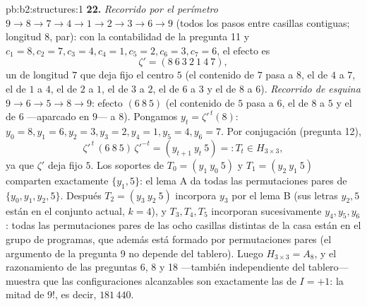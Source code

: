 \begin{solution}{pb:b2:structures:1}
\textbf{22.} \emph{Recorrido por el perímetro} $9 \to 8 \to 7 \to 4
\to 1 \to 2 \to 3 \to 6 \to 9$ (todos los pasos entre casillas
contiguas; longitud $8$, par): con la contabilidad de la pregunta
11 y $c_1 = 8, c_2 = 7, c_3 = 4, c_4 = 1, c_5 = 2, c_6 = 3, c_7 =
6$, el efecto es
\[
\zeta' = (8\ 6\ 3\ 2\ 1\ 4\ 7),
\]
un  de longitud $7$ que deja fijo el centro $5$ (el contenido
de $7$ pasa a $8$, el de $4$ a $7$, el de $1$ a $4$, el de $2$ a
$1$, el de $3$ a $2$, el de $6$ a $3$ y el de $8$ a $6$).
\emph{Recorrido de esquina} $9 \to 6 \to 5 \to 8 \to 9$: efecto
$(6\ 8\ 5)$ (el contenido de $5$ pasa a $6$, el de $8$ a $5$ y el
de $6$ ---aparcado en $9$--- a $8$). Pongamos $y_t =
\zeta'^{\,t}(8)$: $y_0 = 8, y_1 = 6, y_2 = 3, y_3 = 2, y_4 = 1, y_5
= 4, y_6 = 7$. Por conjugación (pregunta 12),
\[
\zeta'^{\,t}\,(6\ 8\ 5)\,\zeta'^{-t}
= (y_{t+1}\ y_t\ 5) =: T_t \in H_{3\times3},
\]
ya que $\zeta'$ deja fijo $5$. Los soportes de $T_0 = (y_1\ y_0\
5)$ y $T_1 = (y_2\ y_1\ 5)$ comparten exactamente $\{y_1, 5\}$: el
lema A da todas las permutaciones pares de $\{y_0, y_1, y_2, 5\}$.
Después $T_2 = (y_3\ y_2\ 5)$ incorpora $y_3$ por el lema B (sus
letras $y_2, 5$ están en el conjunto actual, $k = 4$), y $T_3, T_4,
T_5$ incorporan sucesivamente $y_4, y_5, y_6$: todas las
permutaciones pares de las ocho casillas distintas de la casa están
en el grupo de programas, que además está formado por permutaciones
pares (el argumento de la pregunta 9 no depende del tablero). Luego
$H_{3\times3} = A_8$, y el razonamiento de las preguntas 6, 8 y 18
---también independiente del tablero--- muestra que las
configuraciones alcanzables son exactamente las de $I = +1$: la
mitad de $9!$, es decir, $181\,440$.


\end{solution}
